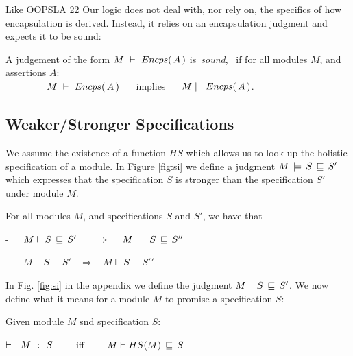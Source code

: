Like OOPSLA 22 Our logic does not {deal with, nor} rely on, the specifics of  how   encapsulation
{is derived}.
{Instead, it relies} on an encapsulation judgment and expects it to be sound:

\begin{definition}
\label{lem:encap-soundness}
A judgement of the form $M\ \vdash\ {Encps(\, A\, )}$  is\  \emph{sound}, \ if 
for all modules $M$, and assertions $A$:\\

$\strut \hspace{1.5cm} M\ \vdash\ {Encps(\, A\, )} \ \ \ \ $ implies $\ \ \ \ \satisfies{M}{\encaps{A}}$.
\end{definition}


 


\subsection{Weaker/Stronger Specifications}

We assume   the existence of a function $HS$ which allows us to look up the holistic specification of a module. 
In Figure \ref{fig:si} we   define a judgment $M\, \models\, S\, \sqsubseteq\, S'$ which expresses that the specification $S$ is stronger than the specification $S'$ under module $M$.  


\begin{lemma}
For all modules $M$, and specifications $S$ and $S'$, we have that\\
\strut \hspace{2cm}-\ \ \  $\strongerI M  S  {S'}    \ \ \ \ \Longrightarrow\ \ \ \ \stronger M S {S'}'$\\
\strut \hspace{2cm}-\ \ \  $M \models S \equiv S'    \ \ \ \ \Longrightarrow\ \ \ \ M \models S \equiv {S'}'$
\end{lemma}

In   Fig.  \ref{fig:si} in the appendix we define the judgment  $M \vdash S\, \sqsubseteq\, S' $.
We now define what it means for a module $M$ to promise a specification $S$:

\begin{definition}
Given module $M$ snd specification $S$:

\strut \hspace{2cm} ${\vdash \ \ M\ \ \mathbf{:}\ \ S}$ \ \ \ \  iff \ \ \ \  $M \vdash HS(M)\, \sqsubseteq\, S$
\end{definition}

